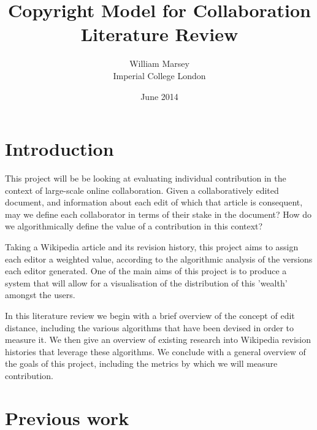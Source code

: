 \documentclass[a4paper,11pt,twoside,notitlepage]{article}
\begin{document}
	\title{Copyright Model for Collaboration
		\\ \small Literature Review}
	\author{William Marsey
		\\Imperial College London}
	\date{June 2014}
 	\maketitle	
        
        \tableofcontents

        \clearpage

        \section{Introduction}
        This project will be be looking at evaluating individual
        contribution in the context of large-scale online
        collaboration. Given a collaboratively edited document, and
        information about each edit of which that article is
        consequent, may we define each collaborator in terms of their
        stake in the document? How do we algorithmically define the
        value of a contribution in this context?

        Taking a Wikipedia article and its revision history, this
        project aims to assign each editor a weighted value, according
        to the algorithmic analysis of the versions each editor
        generated. One of the main aims of this project is to produce
        a system that will allow for a visualisation of the
        distribution of this 'wealth' amongst the users.
        
        In this literature review we begin with a brief overview of
        the concept of edit distance, including the various algorithms
        that have been devised in order to measure it. We then give an
        overview of existing research into Wikipedia revision
        histories that leverage these algorithms. We conclude with a
        general overview of the goals of this project, including the
        metrics by which we will measure contribution.

        \section{Previous work}
\end{document}
